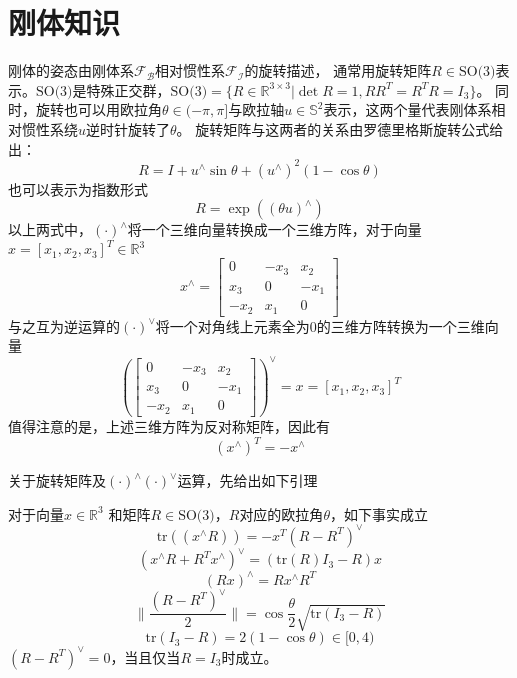 \section{刚体知识}
刚体的姿态由刚体系$\mathcal{F_B}$相对惯性系$\mathcal{F_I}$的旋转描述，
通常用旋转矩阵$R\in \text{SO(3)}$表示。$\text{SO(3)}$是特殊正交群，$\text{SO(3)}=\{R\in \mathbb{R}^{3\times 3}|\det R =1,RR^T=R^TR=I_3\}$。
同时，旋转也可以用欧拉角$\theta\in(-\pi,\pi]$与欧拉轴$u\in \mathbb{S}^2$表示，这两个量代表刚体系相对惯性系绕$u$逆时针旋转了$\theta$。
旋转矩阵与这两者的关系由罗德里格斯旋转公式\cite{sola2018micro}给出：
\begin{equation}
    R=I+u^\wedge\sin\theta+(u^\wedge)^2(1-\cos\theta)
\end{equation}
也可以表示为指数形式
\begin{equation}
    R=\exp((\theta u)^\wedge)
\end{equation}
以上两式中，$(\cdot)^\wedge$将一个三维向量转换成一个三维方阵，对于向量$x=[x_1,x_2,x_3]^T\in\mathbb{R}^3$
\begin{equation}
    x^\wedge=\left[\begin{matrix} 0&-x_3&x_2\\x_3&0&-x_1\\-x_2&x_1&0\end{matrix}\right]
\end{equation}
与之互为逆运算的$(\cdot)^\vee$将一个对角线上元素全为0的三维方阵转换为一个三维向量
\begin{equation}
    \left(\left[\begin{matrix} 0&-x_3&x_2\\x_3&0&-x_1\\-x_2&x_1&0\end{matrix}\right]\right)^\vee=x=[x_1,x_2,x_3]^T
\end{equation}
值得注意的是，上述三维方阵为反对称矩阵，因此有
\begin{equation}
    \label{eq:fanduichen}
    (x^\wedge)^T=-x^\wedge
\end{equation}

关于旋转矩阵及$(\cdot)^\wedge$$(\cdot)^\vee$运算，先给出如下引理
\begin{lemma}\cite{zou2017rotation}
    \label{lm:trace}
    对于向量$x\in\mathbb{R}^3$ 和矩阵$R\in\text{SO(3)}$，$R$对应的欧拉角$\theta$，如下事实成立
    \begin{equation}
        \text{tr}((x^\wedge R))=-x^T(R-R^T)^\vee
    \end{equation}
    \begin{equation}
        (x^\wedge R+R^Tx^\wedge)^\vee=(\text{tr}(R)I_3-R)x
    \end{equation}
    \begin{equation}
        (Rx)^\wedge=Rx^\wedge R^T
    \end{equation}
    \begin{equation}
        \parallel\frac{(R-R^T)^\vee}{2}\parallel=\cos\frac{\theta}{2}\sqrt{\text{tr}(I_3-R)}
    \end{equation}
    \begin{equation}
        \text{tr}(I_3-R)=2(1-\cos\theta)\in[0,4)
    \end{equation}
    $(R-R^T)^\vee=0$，当且仅当$R=I_3$时成立。
\end{lemma}

